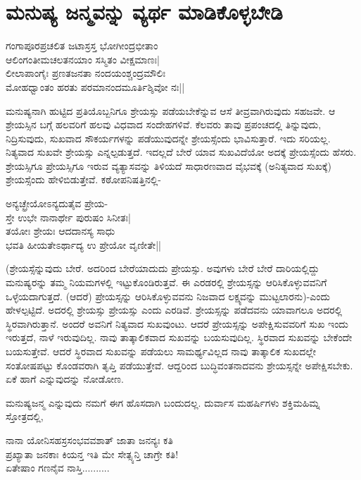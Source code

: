\newpage

\section{ಮನುಷ್ಯ ಜನ್ಮವನ್ನು ವ್ಯರ್ಥ ಮಾಡಿಕೊಳ್ಳಬೇಡಿ}

\begin{shloka}
ಗಂಗಾಪೂರಪ್ರಚಲಿತ ಜಟಾಸ್ರಸ್ತ ಭೋಗೀಂದ್ರಭೀತಾಂ\\
ಆಲಿಂಗಂತೀಮಚಲತನಯಾಂ ಸಸ್ಮಿತಂ ವೀಕ್ಷಮಾಣಃ|\\
ಲೀಲಾಪಾಂಗೈಃ ಪ್ರಣತಜನತಾ ನಂದಯಂಶ್ಚಂದ್ರಮೌಲಿಃ\\
ಮೋಹಧ್ವಾಂತಂ ಹರತು ಪರಮಾನಂದಮೂರ್ತಿಶ್ಶಿವೋ ನಃ||
\end{shloka}

ಮನುಷ್ಯನಾಗಿ ಹುಟ್ಟಿದ ಪ್ರತಿಯೊಬ್ಬನಿಗೂ ಶ್ರೇಯಸ್ಸು ಪಡೆಯಬೇಕೆನ್ನುವ ಆಸೆ ತೀವ್ರವಾಗಿರುವುದು ಸಹಜವೇ. ಆ ಶ್ರೇಯಸ್ಸಿನ ಬಗ್ಗೆ ಹಲವರಿಗೆ ಹಲವು ವಿಧವಾದ ಸಂದೇಹಗಳಿವೆ. ಕೆಲವರು ತಾವು ಪ್ರಪಂಚದಲ್ಲಿ ತಿನ್ನುವುದು, ನಿದ್ರಿಸುವುದು, ಸುಖವಾದ ಸೌಕರ್ಯಗಳನ್ನು ಪಡೆಯುವುದನ್ನೇ ಶ್ರೇಯಸ್ಸೆಂದು ಭಾವಿಸುತ್ತಾರೆ. ಇದು ಸರಿಯಲ್ಲ. ನಿತ್ಯವಾದ ಸುಖವೇ ಶ್ರೇಯಸ್ಸು ಎನ್ನಲ್ಪಡುತ್ತದೆ. ಇದಲ್ಲದೆ ಬೇರೆ ಯಾವ ಸುಖವಿದೆಯೋ ಅದಕ್ಕೆ ಪ್ರೇಯಸ್ಸೆಂದು ಹೆಸರು. ಶ್ರೇಯಸ್ಸಿಗೂ ಪ್ರೇಯಸ್ಸಿಗೂ ಇರುವ ವ್ಯತ್ಯಾಸವನ್ನು ತಿಳಿಯದೆ ಸಾಧಾರಣವಾದ ವೈಭವಕ್ಕೆ (ಅನಿತ್ಯವಾದ ಸುಖಕ್ಕೆ) ಶ್ರೇಯಸ್ಸೆಂದು ಹೇಳಿಬಿಡುತ್ತೇವೆ. ಕಠೋಪನಿಷತ್ತಿನಲ್ಲಿ-

\begin{shloka}
ಅನ್ಯಚ್ಛ್ರೇಯೋಽನ್ಯದುತೈವ ಪ್ರೇಯ-\\
ಸ್ತೇ ಉಭೇ ನಾನಾರ್ಥೇ ಪುರುಷಂ ಸಿನೀತಃ|\\
ತಯೋಃ ಶ್ರೇಯಃ ಆದದಾನಸ್ಯ ಸಾಧು\\
ಭವತಿ ಹೀಯತೇಽರ್ಥಾದ್ಯ ಉ ಪ್ರೇಯೋ ವೃಣೀತೇ||
\end{shloka}

(ಶ್ರೇಯಸ್ಸೆನ್ನುವುದು ಬೇರೆ. ಅದರಿಂದ ಬೇರೆಯಾದುದು ಪ್ರೇಯಸ್ಸು. ಅವುಗಳು ಬೇರೆ ಬೇರೆ ದಾರಿಯಲ್ಲಿದ್ದು ಮನುಷ್ಯರನ್ನು ತಮ್ಮ ನಿಯಮಗಳಲ್ಲಿ ಇಟ್ಟುಕೊಂಡಿರುತ್ತವೆ. ಈ ಎರಡರಲ್ಲಿ ಶ್ರೇಯಸ್ಸನ್ನು ಆರಿಸಿಕೊಳ್ಳುವವನಿಗೆ ಒಳ್ಳೆಯದಾಗುತ್ತದೆ. (ಆದರೆ) ಪ್ರೇಯಸ್ಸನ್ನು ಆರಿಸಿಕೊಳ್ಳುವವನು ನಿಜವಾದ ಲಕ್ಷ್ಯವನ್ನು ಮುಟ್ಟಲಾರನು)-ಎಂದು ಹೇಳಲ್ಪಟ್ಟಿದೆ. ಅದರಲ್ಲಿ ಶ್ರೇಯಸ್ಸು ಪ್ರೇಯಸ್ಸು ಎಂದು ಎರಡಿವೆ. ಶ್ರೇಯಸ್ಸನ್ನು ಪಡೆದವನು ಯಾವಾಗಲೂ ಅದರಲ್ಲಿ ಸ್ಥಿರವಾಗಿರುತ್ತಾನೆ. ಅಂದರೆ ಅವನಿಗೆ ನಿತ್ಯವಾದ ಸುಖವುಂಟು. ಆದರೆ ಪ್ರೇಯಸ್ಸನ್ನು ಅಪೇಕ್ಷಿಸುವವರಿಗೆ ಸುಖ ಇಂದು ಇರುತ್ತದೆ, ನಾಳೆ ಇರುವುದಿಲ್ಲ. ನಾವು ತಾತ್ಕಾಲಿಕವಾದ ಸುಖವನ್ನು ಬಯಸುವುದಿಲ್ಲ. ಸ್ಥಿರವಾದ ಸುಖವನ್ನು ಬೇಕೆಂದೇ ಬಯಸುತ್ತೇವೆ. ಆದರೆ ಸ್ಥಿರವಾದ ಸುಖವನ್ನು ಪಡೆಯಲು ಸಾಮರ್ಥ್ಯವಿಲ್ಲದ ನಾವು ತಾತ್ಕಾಲಿಕ ಸುಖದಲ್ಲೇ ಸಂತೋಷಪಟ್ಟು ಕೊಂಡವರಾಗಿ ತೃಪ್ತಿ ಪಡೆಯುತ್ತೇವೆ. ಆದ್ದರಿಂದ ಬುದ್ಧಿವಂತನಾದವನು ಶ್ರೇಯಸ್ಸನ್ನೇ ಅಪೇಕ್ಷಿಸಬೇಕು. ಏಕೆ ಹಾಗೆ ಎನ್ನುವುದನ್ನು ನೋಡೋಣ.

ಮನುಷ್ಯಜನ್ಮ ಎನ್ನುವುದು ನಮಗೆ ಈಗ ಹೊಸದಾಗಿ ಬಂದುದಲ್ಲ. ದುರ್ವಾಸ ಮಹರ್ಷಿಗಳು ಶಕ್ತಿಮಹಿಮ್ನ ಸ್ತೋತ್ರದಲ್ಲಿ,

\begin{shloka}
ನಾನಾ  ಯೋನಿಸಹಸ್ರಸಂಭವವಶಾತ್  ಜಾತಾ ಜನನ್ಯಃ ಕತಿ\\
ಪ್ರಖ್ಯಾತಾ ಜನಕಾಃ ಕಿಯನ್ತ ಇತಿ ಮೇ ಸೇತ್ಸ್ಯನ್ತಿ ಚಾಗ್ರೇ ಕತಿ!\\
ಏತೇಷಾಂ ಗಣನೈವ ನಾಸ್ತಿ..........
\end{shloka}

